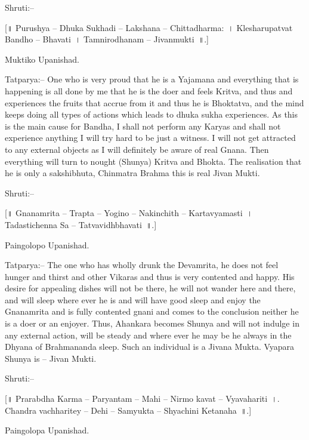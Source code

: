 Shruti:–

[॥ Purushya – Dhuka Sukhadi – Lakshana – Chittadharma:~। Klesharupatvat Bandho – Bhavati~। Tamnirodhanam – Jivanmukti~॥.]

Muktiko Upanishad.

Tatparya:– One who is very proud that he is a Yajamana and everything that is happening is all done by me that he is the doer and feels Kritva, and thus and experiences the fruits that accrue from it and thus he is Bhoktatva, and the mind keeps doing all types of actions which leads to dhuka sukha experiences. As this is the main cause for Bandha, I shall not perform any Karyas and shall not experience anything I will try hard to be just a witness. I will not get attracted to any external objects as I will definitely be aware of real Gnana. Then everything will turn to nought (Shunya) Kritva and Bhokta. The realisation that he is only a sakshibhuta, Chinmatra Brahma this is real Jivan Mukti.

Shruti:–

[॥ Gnanamrita – Trapta – Yogino – Nakinchith – Kartavyamasti~। Tadastichenna Sa – Tatvavidhbhavati~॥.]

Paingolopo Upanishad.

Tatparya:– The one who has wholly drunk the Devamrita, he does not feel hunger and thirst and other Vikaras and thus is very contented and happy. His desire for appealing dishes will not be there, he will not wander here and there, and will sleep where ever he is and will have good sleep and enjoy the Gnanamrita and is fully contented gnani and comes to the conclusion neither he is a doer or an enjoyer. Thus, Ahankara becomes Shunya and will not indulge in any external action, will be steady and where ever he may be he always in the Dhyana of Brahmananda sleep. Such an individual is a Jivana Mukta. Vyapara Shunya is – Jivan Mukti.

Shruti:–

[॥ Prarabdha Karma – Paryantam – Mahi – Nirmo kavat – Vyavahariti~।. Chandra vachharitey – Dehi – Samyukta – Shyachini Ketanaha~॥.]

Paingolopa Upanishad.

